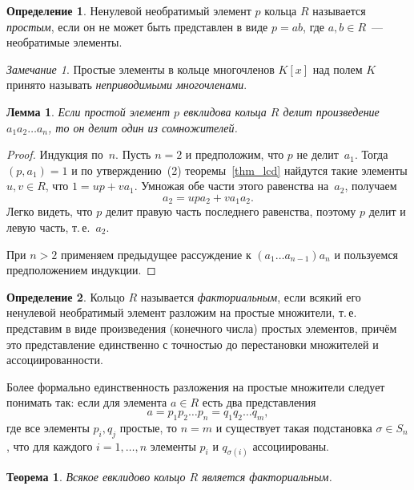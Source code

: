 \documentclass[a4paper,10pt]{amsart}
\newtheorem{theorem}{Теорема}
\newtheorem{lemma}{Лемма}
\theoremstyle{definition}
\newtheorem{definition}{Определение}
\theoremstyle{remark}
\newtheorem{remark}{Замечание}
\begin{document}
\begin{definition}
Ненулевой необратимый элемент $p$ кольца $R$ называется {\it
простым}, если он не может быть представлен в виде $p = a b$, где
$a, b \in R$~--- необратимые элементы.
\end{definition}

\begin{remark}
Простые элементы в кольце многочленов $K[x]$ над полем $K$ принято
называть {\it неприводимыми многочленами}.
\end{remark}

\begin{lemma} \label{ll}
Если простой элемент $p$ евклидова кольца $R$ делит произведение
$a_1a_2\ldots a_n$, то он делит один из сомножителей.
\end{lemma}

\begin{proof}
Индукция по~$n$. Пусть $n=2$ и предположим, что $p$ не делит~$a_1$.
Тогда $(p, a_1) = 1$ и по утверждению~(2) теоремы~\ref{thm_lcd}
найдутся такие элементы $u, v \in R$, что $1 = up + v a_1$. Умножая
обе части этого равенства на~$a_2$, получаем
$$
a_2 = upa_2 + v a_1a_2.
$$
Легко видеть, что $p$ делит правую часть последнего равенства,
поэтому $p$ делит и левую часть, т.\,е.~$a_2$.

При $n > 2$ применяем предыдущее рассуждение к $(a_1 \ldots
a_{n-1})a_n$ и пользуемся предположением индукции.
\end{proof}

\begin{definition}
Кольцо $R$ называется {\it факториальным}, если всякий его ненулевой
необратимый элемент \guillemotleft разложим на простые
множители\guillemotright{}, т.\,е. представим в виде произведения
(конечного числа) простых элементов, причём это представление
единственно с точностью до перестановки множителей и
ассоциированности.
\end{definition}

Более формально единственность разложения на простые множители
следует понимать так: если для элемента $a \in R$ есть два
представления
$$
a = p_1 p_2 \ldots p_n = q_1q_2 \ldots q_m,
$$
где все элементы $p_i, q_j$ простые, то $n = m$ и существует такая
подстановка $\sigma \in S_n$, что для каждого $i = 1,\ldots, n$
элементы $p_i$ и $q_{\sigma(i)}$ ассоциированы.

\begin{theorem} \label{thm_er_ufd}
Всякое евклидово кольцо $R$ является факториальным.
\end{theorem}
\end{document}
